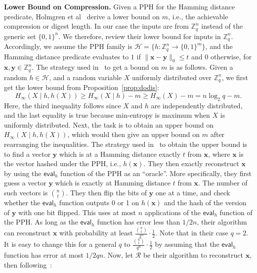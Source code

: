 \documentclass[pdflatex,sn-mathphys-num]{sn-jnl}
\newcommand{\descr}[1]{\vspace{0.2cm} \noindent \textbf{#1}}
\theoremstyle{definition}
\newcommand{\vtr}[1]{\mathbf{#1}}
\newcommand{\norm}[1]{\lVert{#1}\rVert}
\begin{document}
\descr{Lower Bound on Compression.} 
Given a PPH for the Hamming distance predicate, Holmgren et al~\cite{holmgren2022nearly} derive a lower bound on $m$, i.e., the achievable compression or digest length. In our case the inputs are from $\mathbb{Z}_q^n$ instead of the generic set $\{0, 1\}^n$. We therefore, review their lower bound for inputs in $\mathbb{Z}_q^n$. Accordingly, we assume the PPH family is $\mathcal{H} = \{h: \mathbb{Z}_q^n \rightarrow \{0, 1\}^m\}$, and the Hamming distance predicate evaluates to $1$ if $\norm{\vtr{x} - \vtr{y}}_0 \leq t$ and $0$ otherwise, for $\vtr{x}, \vtr{y} \in \mathbb{Z}_q^n$.
The strategy used in~\cite{holmgren2022nearly} to get a bound on $m$ is as follows. Given a random $h \in \mathcal{H}$, and a random variable $X$ uniformly distributed over $\mathbb{Z}_q^n$, we first get the lower bound from Proposition~\ref{prop:dodis}:
\begin{equation}
\label{eq:min-ent-lower}
H_\infty(X \mid h, h(X)) \geq H_\infty(X \mid h) - m \geq H_\infty(X) - m = n \log_2 q - m.    
\end{equation}
Here, the third inequality follows since $X$ and $h$ are independently distributed, and the last equality is true because min-entropy is maximum when $X$ is uniformly distributed. Next, the task is to obtain an upper bound on $H_\infty(X \mid h, h(X))$, which would then give an upper bound on $m$ after rearranging the inequalities. The strategy used in~\cite{holmgren2022nearly} to obtain the upper bound is to find a vector $\vtr{y}$ which is at a Hamming distance exactly $t$ from $\vtr{x}$, where $\vtr{x}$ is the vector hashed under the PPH, i.e., $h(\vtr{x})$. They then exactly reconstruct $\vtr{x}$ by using the $\mathsf{eval}_h$ function of the PPH as an ``oracle''. More specifically, they first guess a vector $\vtr{y}$ which is exactly at Hamming distance $t$ from $\vtr{x}$. The number of such vectors is $\binom{n}{t}$. They then flip the bits of $\vtr{y}$ one at a time, and check whether the $\mathsf{eval}_h$ function outputs 0 or 1 on $h(\vtr{x})$ and the hash of the version of $\vtr{y}$ with one bit flipped. This uses at most $n$ applications of the $\mathsf{eval}_h$ function of the PPH. As long as the $\mathsf{eval}_h$ function has error less than $1/2n$, their algorithm can reconstruct $\vtr{x}$ with probability at least $\frac{\binom{n}{t}}{2^n} \cdot \frac{1}{2}$. Note that in their case $q = 2$. It is easy to change this for a general $q$ to $\frac{\binom{n}{t}}{q^n} \cdot \frac{1}{2}$ by assuming that the $\mathsf{eval}_h$ function has error at most $1/2qn$. Now, let $\mathcal{R}$ be their algorithm to reconstruct $\vtr{x}$, then following~\cite{holmgren2022nearly}:
\end{document}
